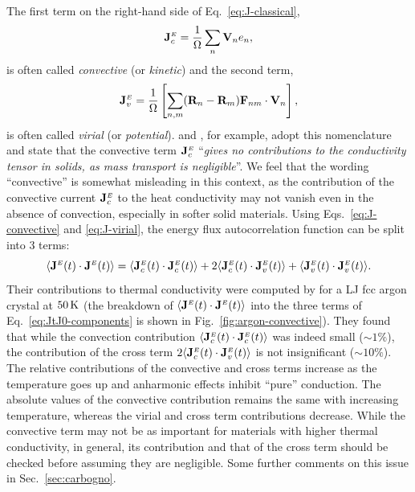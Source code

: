 \begin{LEtext}
The first term on the right-hand side of Eq.~\eqref{eq:J-classical},
\begin{equation}
    \mathbf{J}^\smallE_c = \frac{1}{\rOmega} \sum_n \mathbf{V}_n e_n , \label{eq:J-convective}
\end{equation}
is often called \emph{convective} (or \emph{kinetic}) and the second term,
\begin{equation}
    \mathbf{J}^\smallE_v = \frac{1}{\rOmega} \left[ \sum_{n,m} (\mathbf{R}_n-\mathbf{R}_m) \mathbf{F}_{n m} \cdot \mathbf{V}_n \right], \label{eq:J-virial}
\end{equation}
is often called \emph{virial} (or \emph{potential}).
\citet{Fan2015} and \citet{Carbogno:2017gc}, for example, adopt this nomenclature and state that the convective term $\mathbf{J}^{\scriptscriptstyle E}_c$ ``\emph{gives no contributions to the conductivity tensor in solids, as mass transport is negligible}''.
We feel that the wording ``convective'' is somewhat misleading in this context, as the contribution of the convective current $\mathbf{J}^{\scriptscriptstyle E}_c$ to the heat conductivity may not vanish even in the absence of convection, especially in softer solid materials. 
Using Eqs.~\eqref{eq:J-convective} and \eqref{eq:J-virial}, the energy flux autocorrelation function can be split into 3 terms:
\begin{equation}
    \langle\mathbf{J}^\smallE(t)\cdot\mathbf{J}^\smallE(t)\rangle = \langle\mathbf{J}_c^\smallE(t)\cdot\mathbf{J}_c^\smallE(t)\rangle + 
    2\langle\mathbf{J}_c^\smallE(t)\cdot\mathbf{J}_v^\smallE(t)\rangle + 
    \langle\mathbf{J}_v^\smallE(t)\cdot\mathbf{J}_v^\smallE(t)\rangle . \label{eq:JtJ0-components}
\end{equation}
Their contributions to thermal conductivity were computed by \citet{McGaughey2006} for a LJ fcc argon crystal at $50\,\mathrm{K}$ (the breakdown of $\langle\mathbf{J}^{\scriptscriptstyle E}(t)\cdot\mathbf{J}^{\scriptscriptstyle E}(t)\rangle$ into the three terms of Eq.~\eqref{eq:JtJ0-components} is shown in Fig.~\ref{fig:argon-convective}). They found that while the convection contribution $\langle\mathbf{J}_c^{\scriptscriptstyle E}(t)\cdot\mathbf{J}_c^{\scriptscriptstyle E}(t)\rangle$ was indeed small ($\sim 1\%$), the contribution of the cross term $2\langle\mathbf{J}_c^{\scriptscriptstyle E}(t)\cdot\mathbf{J}_v^{\scriptscriptstyle E}(t)\rangle$ is not insignificant ($\sim 10\%$). 
The relative contributions of the convective and cross terms increase as the temperature goes up and anharmonic effects inhibit ``pure'' conduction. 
The absolute values of the convective contribution remains the same with increasing temperature, whereas the virial and cross term contributions decrease. 
While the convective term may not be as important for materials with higher thermal conductivity, in general, its contribution and that of the cross term should be checked before assuming they are negligible. Some further comments on this issue in Sec.~\ref{sec:carbogno}. 


\end{LEtext}
